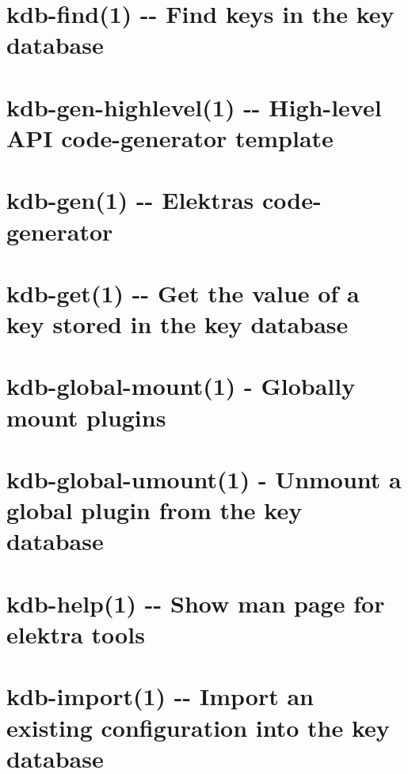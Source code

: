 \documentclass[twoside]{book}
\newcommand{\+}{\discretionary{\mbox{\scriptsize$\hookleftarrow$}}{}{}}
\begin{document}
\chapter{kdb-\/find(1) -\/-\/ Find keys in the key database}
\label{doc_help_kdb-find_md}

\chapter{kdb-\/gen-\/highlevel(1) -\/-\/ High-\/level A\+PI code-\/generator template}
\label{doc_help_kdb-gen-highlevel_md}

\chapter{kdb-\/gen(1) -\/-\/ Elektra\textquotesingle{}s code-\/generator}
\label{doc_help_kdb-gen_md}

\chapter{kdb-\/get(1) -\/-\/ Get the value of a key stored in the key database}
\label{doc_help_kdb-get_md}

\chapter{kdb-\/global-\/mount(1) -\/ Globally mount plugins}
\label{doc_help_kdb-global-mount_md}

\chapter{kdb-\/global-\/umount(1) -\/ Unmount a global plugin from the key database}
\label{doc_help_kdb-global-umount_md}

\chapter{kdb-\/help(1) -\/-\/ Show man page for elektra tools}
\label{doc_help_kdb-help_md}

\chapter{kdb-\/import(1) -\/-\/ Import an existing configuration into the key database}
\label{doc_help_kdb-import_md}

\end{document}
